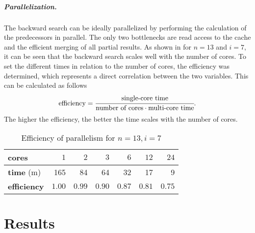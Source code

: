 \documentclass[a4paper,UKenglish,cleveref, autoref, thm-restate]{lipics-v2021}
\begin{document}
\subparagraph{Parallelization.} \label{sec:backward:parallelisation}
The backward search can be ideally parallelized by performing the calculation of the predecessors in parallel.
The only two bottlenecks are read access to the cache and the efficient merging of all partial results.
As shown in  for $n = 13$ and $i = 7$, it can be seen that the backward search scales well with the number of cores.
To set the different times in relation to the number of cores, the efficiency was determined, which represents a direct correlation between the two variables.
This can be calculated as follows
\[
  \text{efficiency} = \cfrac{\text{single-core time}}{\text{number of cores} \cdot \text{multi-core time}}\text.
\]
The higher the efficiency, the better the time scales with the number of cores.

\begin{table}[!t]
  \renewcommand{\arraystretch}{1.1}
  \caption{Efficiency of parallelism for $n = 13, i = 7$}
  \label{table:backward-parallel}
  \centering
  \small
  \begin{tabular}{l|rrrrrr}
    \textbf{cores}      & $1$    & $2$    & $3$    & $6$    & $12$   & $24$   \\ \hline
    \textbf{time} (m)   & 165    & 84     & 64     & 32     & 17     & 9      \\ \hline
    \textbf{efficiency} & $1.00$ & $0.99$ & $0.90$ & $0.87$ & $0.81$ & $0.75$
  \end{tabular}
\end{table}

\section{Results}
\end{document}
